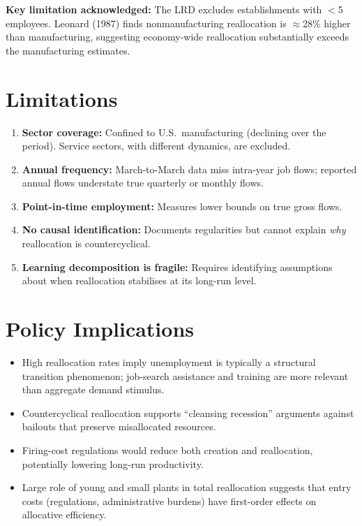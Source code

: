 \textbf{Key limitation acknowledged:} The LRD excludes establishments with
$<$5 employees. Leonard (1987) finds nonmanufacturing reallocation is
$\approx$28\% higher than manufacturing, suggesting economy-wide reallocation
substantially exceeds the manufacturing estimates.

\section{Limitations}

\begin{enumerate}
  \item \textbf{Sector coverage:} Confined to U.S.\ manufacturing (declining
    over the period). Service sectors, with different dynamics, are excluded.
  \item \textbf{Annual frequency:} March-to-March data miss intra-year job
    flows; reported annual flows understate true quarterly or monthly flows.
  \item \textbf{Point-in-time employment:} Measures lower bounds on true
    gross flows.
  \item \textbf{No causal identification:} Documents regularities but cannot
    explain \emph{why} reallocation is countercyclical.
  \item \textbf{Learning decomposition is fragile:} Requires identifying
    assumptions about when reallocation stabilises at its long-run level.
\end{enumerate}

\section{Policy Implications}

\begin{itemize}
  \item High reallocation rates imply unemployment is typically a structural
    transition phenomenon; job-search assistance and training are more relevant
    than aggregate demand stimulus.
  \item Countercyclical reallocation supports ``cleansing recession'' arguments
    against bailouts that preserve misallocated resources.
  \item Firing-cost regulations would reduce both creation and reallocation,
    potentially lowering long-run productivity.
  \item Large role of young and small plants in total reallocation suggests
    that entry costs (regulations, administrative burdens) have first-order
    effects on allocative efficiency.
\end{itemize}

